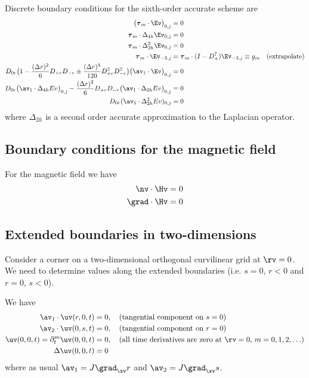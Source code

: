 \documentclass[10pt]{article}
\begin{document}
Discrete boundary conditions for the sixth-order accurate scheme are
\begin{align*}
    \big(\tauv_m\cdot\Ev\big)_{0,j}  &=0  \\
 \tauv_m\cdot\Delta_{4h} \Ev_{0,j}  &=0  \\
 \tauv_m\cdot\Delta_{2h}^2 \Ev_{0,j}  &=0  \\
  \tauv_m\cdot\Ev_{-3,j} &= \tauv_m \cdot (I-D_+^7)\Ev_{-3,j} \equiv g_m   \quad\mbox{(extrapolate)}\\
  D_{0r}\big(1- {(\Delta r)^2\over 6} D_{+r}D_{-r}  
                  \pm {(\Delta r)^4\over 120} D_{+r}^2D_{-r}^2 \big)
                          \big(\av_1\cdot\Ev\big)_{0,j} &= 0 \\
  D_{0r}\big(\av_1\cdot \Delta_{4h}Ev \big)_{0,j}
    -{(\Delta r)^2\over 6} D_{+r}D_{-r}\big( \av_1\cdot \Delta_{2h}Ev\big)_{0,j} &= 0 \\
  D_{0r} (\av_1\cdot \Delta_{2h}^2 Ev )_{0,j} &= 0 
\end{align*}
where $\Delta_{2h}$ is a second order accurate approximation to the Laplacian operator.

\subsection{Boundary conditions for the magnetic field}
For the magnetic field we have
\begin{align*}
  \nv\cdot\Hv &= 0 \\
  \grad\cdot\Hv &=0 \\
\end{align*}

\clearpage
\subsection{Extended boundaries in two-dimensions}

Consider a corner on a two-dimensional orthogonal curvilinear grid at $\rv=0$.
We need to determine values along the extended boundaries (i.e. $s=0$, $r<0$ and $r=0$, $s<0$).


We have
\begin{align*}
  \av_1\cdot\uv(r,0,t) &= 0,  \quad\mbox{(tangential component on $s=0$)}\\
  \av_2\cdot\uv(0,s,t) &= 0,  \quad\mbox{(tangential component on $r=0$)}\\
  \uv(0,0,t)=\partial_t^m\uv(0,0,t) &= 0, \quad\mbox{(all time derivatives are zero at $\rv=0$, $m=0,1,2,\ldots$)} \\
  \Delta\uv(0,0,t) & =0
\end{align*}
where as usual $\av_1=J \grad_\xv r$ and $\av_2=J \grad_\xv s$.
\end{document}
